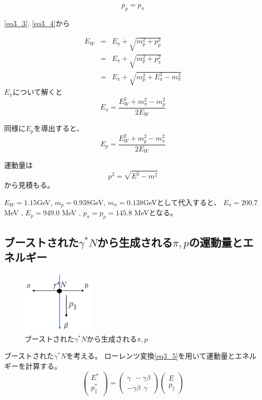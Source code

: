 \begin{equation}
    \label{eq3_4}
    p_p = p_\pi
\end{equation}

\ref{eq3_3}, \ref{eq3_4}から

\begin{eqnarray}
    E_W  & =  & E_\pi + \sqrt{m_p^2 + p_p^2} \\
    & = & E_\pi + \sqrt{m_p^2 + p_\pi^2} \\
    & = & E_\pi + \sqrt{m_p^2 + E_\pi^2 - m_\pi^2}
\end{eqnarray}
$E_\pi$について解くと
\begin{equation}
    E_\pi = \dfrac{E_W ^2 + m_\pi ^2 - m_p ^2}{2E_W}
\end{equation}

同様に$E_p$を導出すると、
\begin{equation}
    E_p = \dfrac{E_W ^2 + m_p ^2 - m_\pi ^2}{2E_W}
\end{equation}

運動量は
\begin{equation}
    p^2 = \sqrt{E^2 - m^2}
\end{equation}
から見積もる。

$E_W = 1.15$GeV, $m_p = 0.938$GeV, $m_\pi = 0.138$GeVとして代入すると、
$E_π = 200.7$MeV , $E_p = 949.0$ MeV , $p_π = p_p = 145.8$ MeVとなる。


\subsection{ブーストされた$\gamma^* N$から生成される$\pi,p$の運動量とエネルギー}
\begin{figure}[H]
    \centering
    \includegraphics[height=3cm]{img/boost_middle_situation.png}
    \caption{ブーストされた$\gamma^* N$から生成される$\pi,p$}
    \label{fig:angle6}
\end{figure}

ブーストされた$\gamma^* N$を考える。
ローレンツ変換\ref{eq3_5}を用いて運動量とエネルギーを計算する。
\begin{equation}
    \label{eq3_5}
    \left(\begin{array}{c}
            E^* \\
            p^*_\parallel
        \end{array}\right)
    =\left(\begin{array}{cc}
            \gamma \ \ -\gamma \beta \\
            -\gamma \beta  \ \  \gamma
        \end{array}\right)
    \left(\begin{array}{c}
            E \\
            p_\parallel
        \end{array}\right)
\end{equation}


